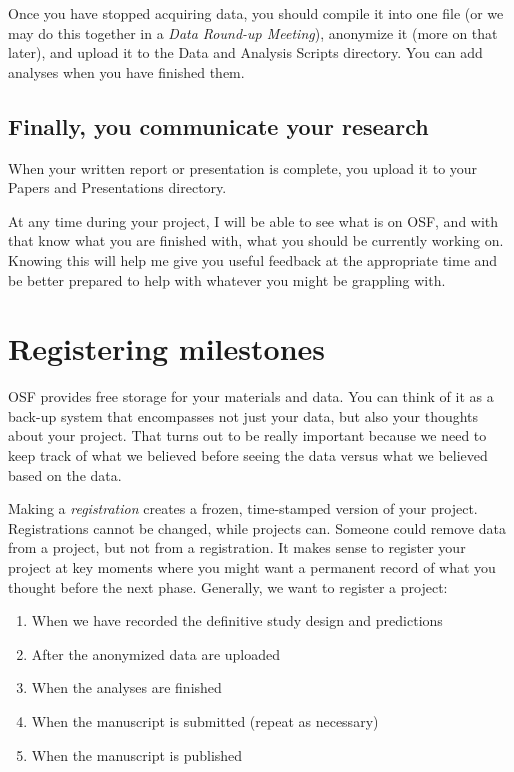 \documentclass[
  12pt,
]{book}
\providecommand{\tightlist}{%
  \setlength{\itemsep}{0pt}\setlength{\parskip}{0pt}}
\begin{document}
Once you have stopped acquiring data, you should compile it into one file (or we may do this together in a \emph{Data Round-up Meeting}), anonymize it (more on that later), and upload it to the Data and Analysis Scripts directory. You can add analyses when you have finished them.

\subsection{Finally, you communicate your research}\label{finally-you-communicate-your-research}

When your written report or presentation is complete, you upload it to your Papers and Presentations directory.

At any time during your project, I will be able to see what is on OSF, and with that know what you are finished with, what you should be currently working on. Knowing this will help me give you useful feedback at the appropriate time and be better prepared to help with whatever you might be grappling with.

\section{Registering milestones}\label{registering-milestones}

OSF provides free storage for your materials and data. You can think of it as a back-up system that encompasses not just your data, but also your thoughts about your project. That turns out to be really important because we need to keep track of what we believed before seeing the data versus what we believed based on the data.

Making a \emph{registration} creates a frozen, time-stamped version of your project. Registrations cannot be changed, while projects can. Someone could remove data from a project, but not from a registration. It makes sense to register your project at key moments where you might want a permanent record of what you thought before the next phase. Generally, we want to register a project:

\begin{enumerate}
\def\labelenumi{\arabic{enumi}.}
\tightlist
\item
  When we have recorded the definitive study design and predictions
\item
  After the anonymized data are uploaded
\item
  When the analyses are finished
\item
  When the manuscript is submitted (repeat as necessary)
\item
  When the manuscript is published
\end{enumerate}
\end{document}
